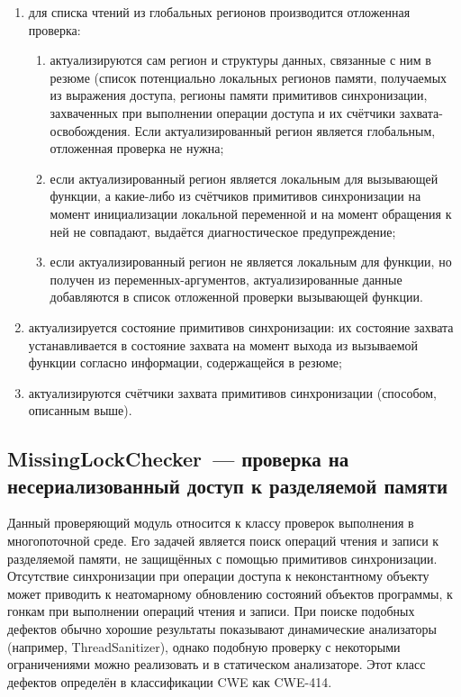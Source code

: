 \begin{enumerate}
 \item для списка чтений из глобальных регионов производится отложенная проверка:
 \begin{enumerate}
  \item актуализируются сам регион и структуры данных, связанные с ним в резюме (список потенциально локальных регионов памяти, получаемых из выражения доступа, регионы памяти примитивов синхронизации, захваченных при выполнении операции доступа и их счётчики захвата-освобождения. Если актуализированный регион является глобальным, отложенная проверка не нужна;
  \item если актуализированный регион является локальным для вызывающей функции, а какие-либо из счётчиков примитивов синхронизации на момент инициализации локальной переменной и на момент обращения к ней не совпадают, выдаётся диагностическое предупреждение;
  \item если актуализированный регион не является локальным для функции, но получен из переменных-аргументов, актуализированные данные добавляются в список отложенной проверки вызывающей функции. 
 \end{enumerate}
 \item актуализируется состояние примитивов синхронизации: их состояние захвата устанавливается в состояние захвата на момент выхода из вызываемой функции согласно информации, содержащейся в резюме;
 \item актуализируются счётчики захвата примитивов синхронизации (способом, описанным выше).
\end{enumerate}


\subsection{MissingLockChecker~--- проверка на несериализованный доступ к разделяемой памяти}

Данный проверяющий модуль относится к классу проверок выполнения в многопоточной среде. Его задачей является поиск операций чтения и записи к разделяемой памяти, не защищённых с помощью примитивов синхронизации. Отсутствие синхронизации при операции доступа к неконстантному объекту может приводить к неатомарному обновлению состояний объектов программы, к гонкам при выполнении операций чтения и записи. При поиске подобных дефектов обычно хорошие результаты показывают динамические анализаторы (например, ThreadSanitizer), однако подобную проверку с некоторыми ограничениями можно реализовать и в статическом анализаторе. Этот класс дефектов определён в классификации CWE как CWE-414.

